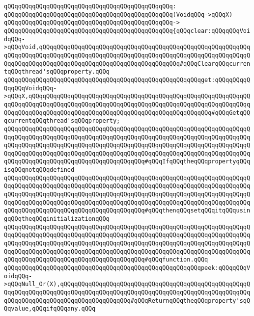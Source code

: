 \verb|qQQqqQQqqQQqqQQqqQQqqQQqqQQqqQQqqQQqqQQqqQQqqQQq:|\newline
\verb|qQQqqQQqqQQqqQQqqQQqqQQqqQQqqQQqqQQqqQQqqQQqqQQq(VoidqQQq->qQQqX)|\newline
\verb|qQQqqQQqqQQqqQQqqQQqqQQqqQQqqQQqqQQqqQQqqQQqqQQq->|\newline
\verb|qQQqqQQqqQQqqQQqqQQqqQQqqQQqqQQqqQQqqQQqqQQqqQQq{qQQqclear:qQQqqQQqVoidqQQq->qQQqVoid,qQQqqQQqqQQqqQQqqQQqqQQqqQQqqQQqqQQqqQQqqQQqqQQqqQQqqQQqqQQqqQQqqQQqqQQqqQQqqQQqqQQqqQQqqQQqqQQqqQQqqQQqqQQqqQQqqQQqqQQqqQQqqQQqqQQqqQQqqQQqqQQqqQQqqQQqqQQqqQQqqQQqqQQqqQQqqQQqqQQq#qQQqClearqQQqcurrentqQQqthread'sqQQqproperty.qQQq|\newline
\newline
\verb|qQQqqQQqqQQqqQQqqQQqqQQqqQQqqQQqqQQqqQQqqQQqqQQqqQQqqQQqget:qQQqqQQqqQQqqQQqVoidqQQq->qQQqX,qQQqqQQqqQQqqQQqqQQqqQQqqQQqqQQqqQQqqQQqqQQqqQQqqQQqqQQqqQQqqQQqqQQqqQQqqQQqqQQqqQQqqQQqqQQqqQQqqQQqqQQqqQQqqQQqqQQqqQQqqQQqqQQqqQQqqQQqqQQqqQQqqQQqqQQqqQQqqQQqqQQqqQQqqQQqqQQqqQQqqQQqqQQqqQQq#qQQqGetqQQqcurrentqQQqthread'sqQQqproperty;|\newline
\verb|qQQqqQQqqQQqqQQqqQQqqQQqqQQqqQQqqQQqqQQqqQQqqQQqqQQqqQQqqQQqqQQqqQQqqQQqqQQqqQQqqQQqqQQqqQQqqQQqqQQqqQQqqQQqqQQqqQQqqQQqqQQqqQQqqQQqqQQqqQQqqQQqqQQqqQQqqQQqqQQqqQQqqQQqqQQqqQQqqQQqqQQqqQQqqQQqqQQqqQQqqQQqqQQqqQQqqQQqqQQqqQQqqQQqqQQqqQQqqQQqqQQqqQQqqQQqqQQqqQQqqQQqqQQqqQQqqQQqqQQqqQQqqQQqqQQqqQQqqQQqqQQqqQQqqQQqqQQqqQQq#qQQqIfqQQqtheqQQqpropertyqQQqisqQQqnotqQQqdefined|\newline
\verb|qQQqqQQqqQQqqQQqqQQqqQQqqQQqqQQqqQQqqQQqqQQqqQQqqQQqqQQqqQQqqQQqqQQqqQQqqQQqqQQqqQQqqQQqqQQqqQQqqQQqqQQqqQQqqQQqqQQqqQQqqQQqqQQqqQQqqQQqqQQqqQQqqQQqqQQqqQQqqQQqqQQqqQQqqQQqqQQqqQQqqQQqqQQqqQQqqQQqqQQqqQQqqQQqqQQqqQQqqQQqqQQqqQQqqQQqqQQqqQQqqQQqqQQqqQQqqQQqqQQqqQQqqQQqqQQqqQQqqQQqqQQqqQQqqQQqqQQqqQQqqQQqqQQqqQQqqQQqqQQq#qQQqthenqQQqsetqQQqitqQQqusingqQQqtheqQQqinitializationqQQq|\newline
\verb|qQQqqQQqqQQqqQQqqQQqqQQqqQQqqQQqqQQqqQQqqQQqqQQqqQQqqQQqqQQqqQQqqQQqqQQqqQQqqQQqqQQqqQQqqQQqqQQqqQQqqQQqqQQqqQQqqQQqqQQqqQQqqQQqqQQqqQQqqQQqqQQqqQQqqQQqqQQqqQQqqQQqqQQqqQQqqQQqqQQqqQQqqQQqqQQqqQQqqQQqqQQqqQQqqQQqqQQqqQQqqQQqqQQqqQQqqQQqqQQqqQQqqQQqqQQqqQQqqQQqqQQqqQQqqQQqqQQqqQQqqQQqqQQqqQQqqQQqqQQqqQQqqQQqqQQqqQQqqQQq#qQQqfunction.qQQq|\newline
\newline
\verb|qQQqqQQqqQQqqQQqqQQqqQQqqQQqqQQqqQQqqQQqqQQqqQQqqQQqqQQqpeek:qQQqqQQqVoidqQQq->qQQqNull_Or(X),qQQqqQQqqQQqqQQqqQQqqQQqqQQqqQQqqQQqqQQqqQQqqQQqqQQqqQQqqQQqqQQqqQQqqQQqqQQqqQQqqQQqqQQqqQQqqQQqqQQqqQQqqQQqqQQqqQQqqQQqqQQqqQQqqQQqqQQqqQQqqQQqqQQqqQQqqQQqqQQq#qQQqReturnqQQqtheqQQqproperty'sqQQqvalue,qQQqifqQQqany.qQQq|\newline
